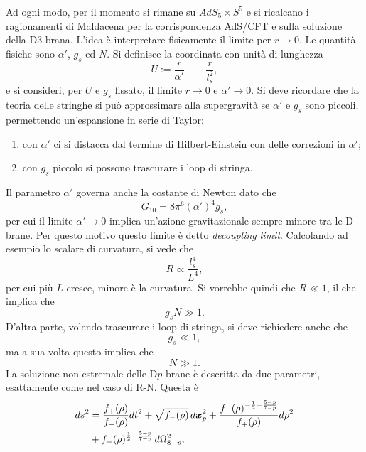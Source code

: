 Ad ogni modo, per il momento si rimane su $AdS_5 \times S^5$ e si ricalcano i ragionamenti di Maldacena per la corrispondenza AdS/CFT e sulla soluzione della D3-brana. L'idea è interpretare fisicamente il limite per $r \to 0$. Le quantità fisiche sono $\alpha'$, $g_s$ ed $N$. Si definisce la coordinata con unità di lunghezza 
\begin{equation}
    U := \frac{r}{\alpha'} \equiv -\frac{r}{l_s^2},
\end{equation}
e si consideri, per $U$ e $g_s$ fissato, il limite $r \to 0$ e $\alpha' \to 0$. Si deve ricordare che la teoria delle stringhe si può approssimare alla supergravità se $\alpha'$ e $g_s$ sono piccoli, permettendo un'espansione in serie di Taylor:
\begin{enumerate}
    \item con $\alpha'$ ci si distacca dal termine di Hilbert-Einstein con delle correzioni in $\alpha'$;
    \item con $g_s$ piccolo si possono trascurare i loop di stringa.
\end{enumerate}
Il parametro $\alpha'$ governa anche la costante di Newton dato che 
\begin{equation}
    G_{10} = 8\pi^6(\alpha')^4g_s,
\end{equation}
per cui il limite $\alpha' \to 0$ implica un'azione gravitazionale sempre minore tra le D-brane. Per questo motivo questo limite è detto \emph{decoupling limit}. Calcolando ad esempio lo scalare di curvatura, si vede che 
\begin{equation}
    R \propto \frac{l_s^4}{L^4},
\end{equation}
per cui più $L$ cresce, minore è la curvatura. Si vorrebbe quindi che $R \ll 1$, il che implica che 
\begin{equation}
    g_sN \gg 1.
\end{equation}
D'altra parte, volendo trascurare i loop di stringa, si deve richiedere anche che 
\begin{equation}
    g_s \ll 1,
\end{equation}
ma a sua volta questo implica che
\begin{equation}
    N \gg 1.
\end{equation}
La soluzione non-estremale delle D$p$-brane è descritta da due parametri, esattamente come nel caso di R-N. Questa è 
\begin{equation}
    \begin{split}
        ds^2 &= \frac{f_+(\rho)}{f_-(\rho)}dt^2 + \sqrt{f_-(\rho)}\,d\bm{x}^2_p + \frac{f_-(\rho)^{-\frac{1}{2} - \frac{5 - p}{7 - p}}}{f_+(\rho)}d\rho^2 \\
        &+ f_-(\rho)^{\frac{1}{2} - \frac{5 - p}{7 - p}}\,d\Omega_{8 - p}^2,
    \end{split}
\end{equation}
